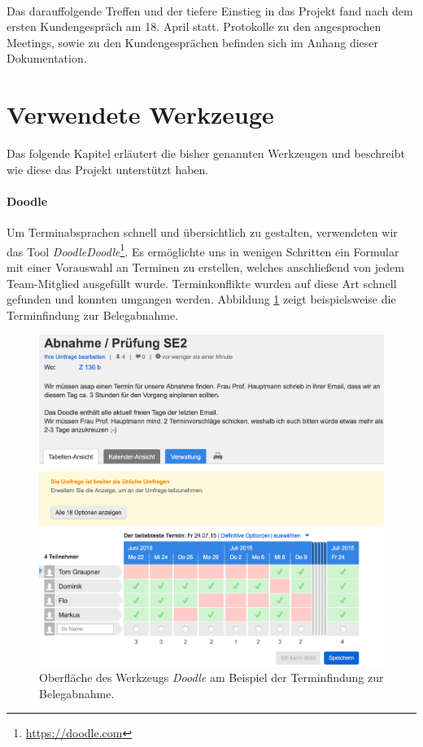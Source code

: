 \paragraph{}Das darauffolgende Treffen und der tiefere Einstieg in das Projekt fand nach dem ersten Kundengespräch am 18. April statt. Protokolle zu den angesprochen Meetings, sowie zu den Kundengesprächen befinden sich im Anhang dieser Dokumentation.

\section{Verwendete Werkzeuge}\label{TeamOrg:Werkzeuge}
Das folgende Kapitel erläutert die bisher genannten Werkzeugen und beschreibt wie diese das Projekt unterstützt haben.

\paragraph{Doodle}Um Terminabsprachen schnell und übersichtlich zu gestalten, verwendeten wir das Tool \textit{Doodle}\textit{Doodle}\footnote{\url{https://doodle.com}}. Es ermöglichte uns in wenigen Schritten ein Formular mit einer Vorauswahl an Terminen zu erstellen, welches anschließend von jedem Team-Mitglied ausgefüllt wurde. Terminkonflikte wurden auf diese Art schnell gefunden und konnten umgangen werden. Abbildung \ref{doodle} zeigt beispielsweise die Terminfindung zur Belegabnahme.

\begin{figure}[h!]
	\centering
	\includegraphics[width=\textwidth]{images/doodle.png}
	\caption{Oberfläche des Werkzeugs \textit{Doodle} am Beispiel der Terminfindung zur Belegabnahme.}
	\label{doodle}
\end{figure}

